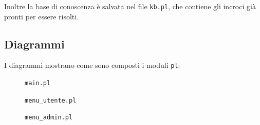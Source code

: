 Inoltre la base di conoscenza è salvata nel file \texttt{kb.pl}, che contiene gli incroci già pronti per essere risolti.

\subsection{Diagrammi}
I diagrammi mostrano come sono composti i moduli \texttt{pl}:


\begin{figure}[!htb]
	\caption{\texttt{main.pl}}
\end{figure}


\begin{figure}
	\caption{\texttt{menu\_utente.pl}}
\end{figure}

\begin{figure}
	\caption{\texttt{menu\_admin.pl}}
\end{figure}
\restoregeometry

